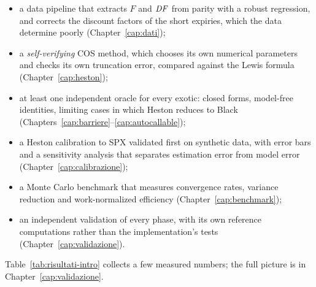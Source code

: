 \begin{itemize}
\item a data pipeline that extracts $F$ and $\mathit{DF}$ from parity with a robust regression, and corrects the discount
factors of the short expiries, which the data determine poorly (Chapter~\ref{cap:dati});
\item a \emph{self-verifying} COS method, which chooses its own numerical parameters and checks its own truncation
error, compared against the Lewis formula (Chapter~\ref{cap:heston});
\item at least one independent oracle for every exotic: closed forms, model-free identities, limiting cases in
which Heston reduces to Black (Chapters~\ref{cap:barriere}--\ref{cap:autocallable});
\item a Heston calibration to SPX validated first on synthetic data, with error bars and a sensitivity analysis that
separates estimation error from model error (Chapter~\ref{cap:calibrazione});
\item a Monte Carlo benchmark that measures convergence rates, variance reduction and work-normalized efficiency
(Chapter~\ref{cap:benchmark});
\item an independent validation of every phase, with its own reference computations rather than the
implementation's tests (Chapter~\ref{cap:validazione}).
\end{itemize}

Table~\ref{tab:risultati-intro} collects a few measured numbers; the full picture is in
Chapter~\ref{cap:validazione}.

